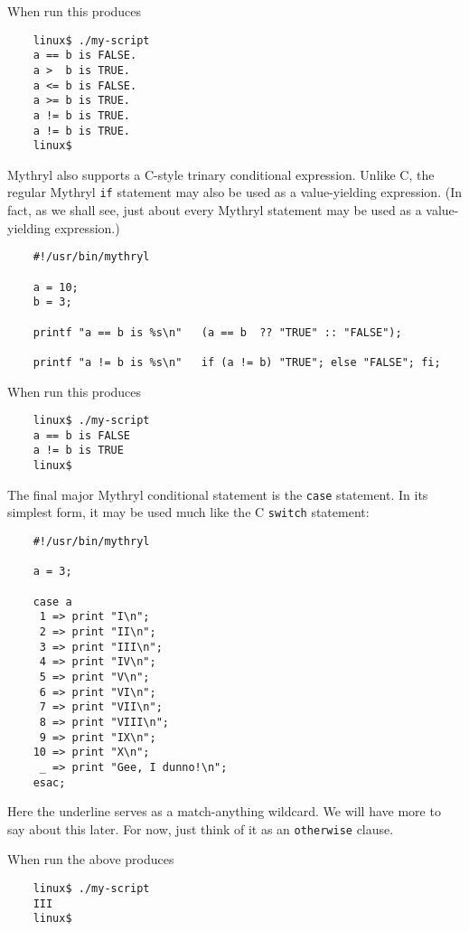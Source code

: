 When run this produces

\begin{verbatim}
    linux$ ./my-script
    a == b is FALSE.
    a >  b is TRUE.
    a <= b is FALSE.
    a >= b is TRUE.
    a != b is TRUE.
    a != b is TRUE.
    linux$
\end{verbatim}

Mythryl also supports a C-style trinary conditional expression. 
Unlike C, the regular Mythryl {\tt if} statement may also be 
used as a value-yielding expression.  (In fact, as we shall see, 
just about every Mythryl statement may be used as a value-yielding 
expression.)

\begin{verbatim}
    #!/usr/bin/mythryl

    a = 10;
    b = 3;

    printf "a == b is %s\n"   (a == b  ?? "TRUE" :: "FALSE");

    printf "a != b is %s\n"   if (a != b) "TRUE"; else "FALSE"; fi;

\end{verbatim}

When run this produces

\begin{verbatim}
    linux$ ./my-script
    a == b is FALSE
    a != b is TRUE
    linux$
\end{verbatim}

The final major Mythryl conditional statement is the {\tt case} statement. 
In its simplest form, it may be used much like the C {\tt switch} statement:


\begin{verbatim}
    #!/usr/bin/mythryl

    a = 3;

    case a
     1 => print "I\n";
     2 => print "II\n";
     3 => print "III\n";
     4 => print "IV\n";
     5 => print "V\n";
     6 => print "VI\n";
     7 => print "VII\n";
     8 => print "VIII\n";
     9 => print "IX\n";
    10 => print "X\n";
     _ => print "Gee, I dunno!\n";
    esac;
\end{verbatim}

Here the underline serves as a match-anything wildcard.  We will have more to 
say about this later.  For now, just think of it as an {\tt otherwise} clause.

When run the above produces
\begin{verbatim}
    linux$ ./my-script
    III
    linux$
\end{verbatim}

